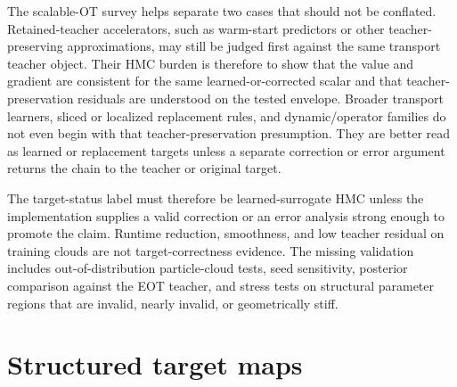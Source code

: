 The scalable-OT survey helps separate two cases that should not be conflated.
Retained-teacher accelerators, such as warm-start predictors or other
teacher-preserving approximations, may still be judged first against the same
transport teacher object.  Their HMC burden is therefore to show that the value
and gradient are consistent for the same learned-or-corrected scalar and that
teacher-preservation residuals are understood on the tested envelope.  Broader
transport learners, sliced or localized replacement rules, and dynamic/operator
families do not even begin with that teacher-preservation presumption.  They are
better read as learned or replacement targets unless a separate correction or
error argument returns the chain to the teacher or original target.

The target-status label must therefore be learned-surrogate HMC unless the
implementation supplies a valid correction or an error analysis strong enough
to promote the claim.  Runtime reduction, smoothness, and low teacher residual
on training clouds are not target-correctness evidence.  The missing validation
includes out-of-distribution particle-cloud tests, seed sensitivity, posterior
comparison against the EOT teacher, and stress tests on structural parameter
regions that are invalid, nearly invalid, or geometrically stiff.

\section{Structured target maps}
\label{sec:bf-dpf-hmc-summary}

